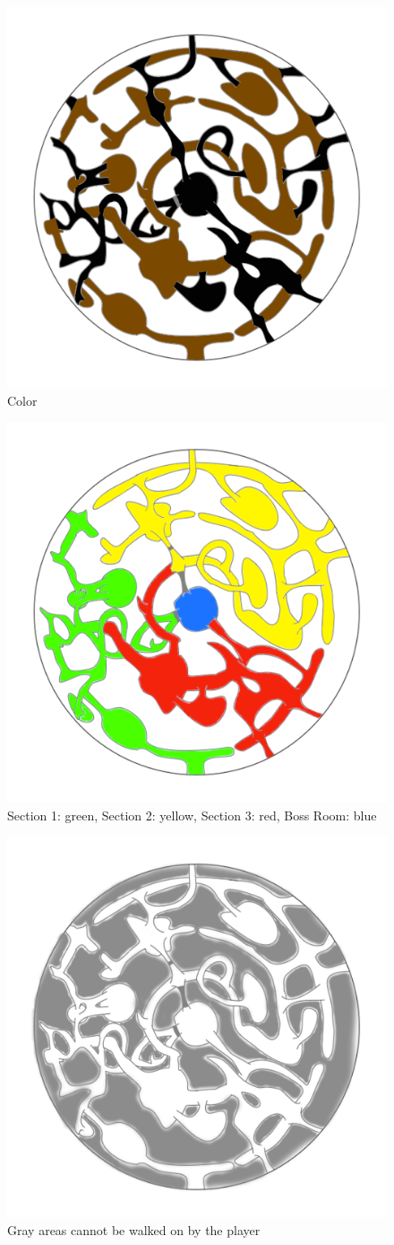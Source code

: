 \begin{figure}[H]
	\centering
	\includegraphics[width=0.6\linewidth]{images/map/2D_map_color.png}
	\caption*{Color}
\end{figure}

\begin{figure}[H]
	\centering
	\includegraphics[width=0.6\linewidth]{images/map/map_all_sections.png}
	\caption*{Section 1: green, Section 2: yellow, Section 3: red, Boss Room: blue}
\end{figure}

\begin{figure}[H]
	\centering
	\includegraphics[width=0.6\linewidth]{images/map/2D_map_not.png}
	\caption*{Gray areas cannot be walked on by the player}
\end{figure}
\newpage

